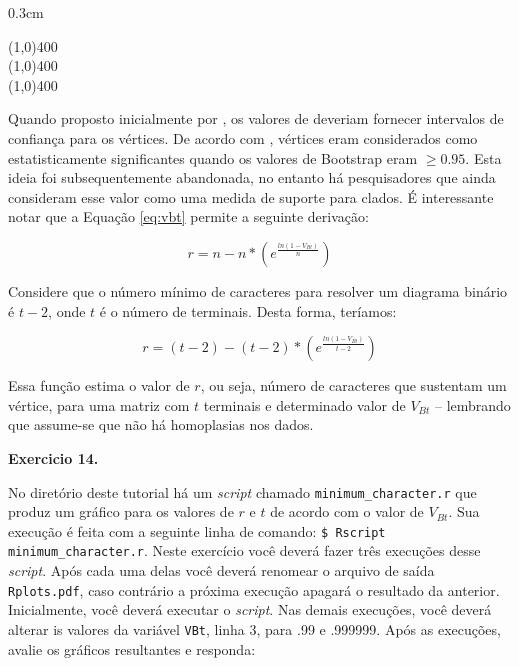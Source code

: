 \begin{refsection}
\begin {myindentpar}{0.3cm}
\begin{enumerate}[\itshape 1.]
\begin{center}
\line(1,0){400}\\
\line(1,0){400}\\
\line(1,0){400}\\
\end{center}


\end{enumerate}
\end{myindentpar}

Quando proposto inicialmente por \textcite{Felsenstein1985}, os valores de deveriam fornecer intervalos de confiança para os vértices. De acordo com \textcite{Felsenstein1985}, vértices eram considerados como estatisticamente significantes quando os valores de Bootstrap eram $\geq 0.95$. Esta ideia foi subsequentemente abandonada, no entanto há pesquisadores que ainda consideram esse valor como uma medida de suporte para clados. É interessante notar que a Equação \ref{eq:vbt} permite a seguinte derivação:

\begin{center}
\begin{equation}\label{eq:r}
r = n - n * (e^\frac{ln(1-V_{Bt})}{n})
\end{equation}
\end{center}


Considere que o número mínimo de caracteres para resolver um diagrama binário é $t-2$, onde $t$ é o número de terminais. Desta forma, teríamos:

\begin{center}
\begin{equation}\label{eq:t}
r = (t-2) - (t-2) * (e^\frac{ln(1-V_{Bt})}{t-2})
\end{equation}
\end{center}

Essa função estima o valor de $r$, ou seja, número de caracteres que sustentam um vértice, para uma matriz com $t$ terminais e determinado valor de $V_{Bt}$ -- lembrando que assume-se que não há homoplasias nos dados.\\


\begin{blackBlock}{\textbf{Exercicio 14.}}\label{tut14:ex:14.2}

No diretório deste tutorial há um \textit{script} chamado \texttt{minimum\_character.r} que produz um gráfico para os valores de $r$ e $t$ de acordo com o valor de $V_{Bt}$. Sua execução é feita com a seguinte linha de comando: \texttt{\$ Rscript minimum\_character.r}. Neste exercício você deverá fazer três execuções desse \textit{script}. Após cada uma delas você deverá renomear o arquivo de saída \texttt{Rplots.pdf}, caso contrário a próxima execução apagará o resultado da anterior. Inicialmente, você deverá executar o \textit{script}. Nas demais execuções, você deverá alterar is valores da variável \texttt{VBt}, linha 3, para .99 e .999999. Após as execuções, avalie os gráficos resultantes e responda:


\end{blackBlock}
\end{refsection}
